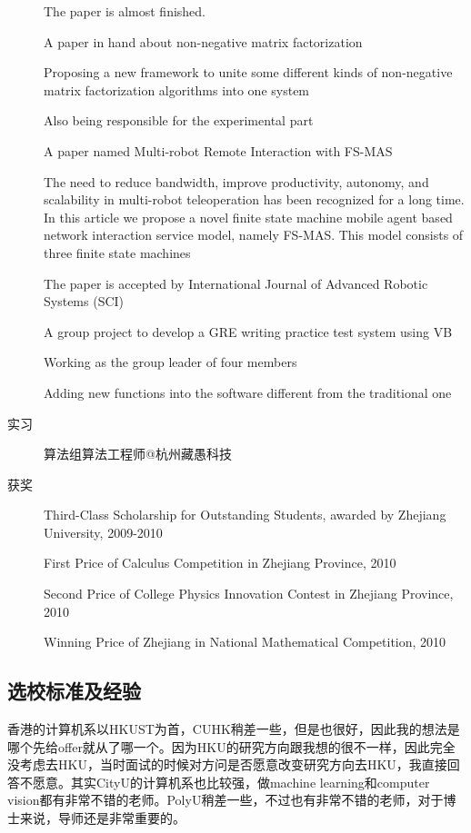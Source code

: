 \documentclass[11pt,fleqn,openany]{book} %
\begin{document}
\begin{description}
  The paper is almost finished.



A paper in hand about non-negative matrix factorization



  Proposing a new framework to unite some different kinds of non-negative matrix factorization algorithms into one system

  Also being responsible for the experimental part



A paper named Multi-robot Remote Interaction with FS-MAS

The need to reduce bandwidth, improve productivity, autonomy, and scalability in multi-robot teleoperation has been recognized for a long time. In this article we propose a novel finite state machine mobile agent based network interaction service model, namely FS-MAS. This model consists of three finite state machines

The paper is accepted by International Journal of Advanced Robotic Systems (SCI)



A group project to develop a GRE writing practice test system using VB



  Working as the group leader of four members

  Adding new functions into the software different from the traditional one
\item[实习] 算法组算法工程师@杭州藏愚科技
\item[获奖] Third-Class Scholarship for Outstanding Students, awarded by Zhejiang University, 2009-2010

  First Price of Calculus Competition in Zhejiang Province, 2010

  Second Price of College Physics Innovation Contest in Zhejiang Province, 2010 

  Winning Price of Zhejiang in National Mathematical Competition, 2010
\end{description}
\subsection*{选校标准及经验}
香港的计算机系以HKUST为首，CUHK稍差一些，但是也很好，因此我的想法是哪个先给offer就从了哪一个。因为HKU的研究方向跟我想的很不一样，因此完全没考虑去HKU，当时面试的时候对方问是否愿意改变研究方向去HKU，我直接回答不愿意。其实CityU的计算机系也比较强，做machine learning和computer vision都有非常不错的老师。PolyU稍差一些，不过也有非常不错的老师，对于博士来说，导师还是非常重要的。
\end{document}
